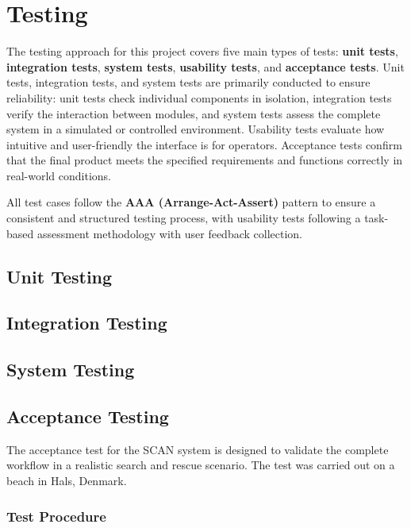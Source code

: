 \chapter{Testing}

The testing approach for this project covers five main types of tests: \textbf{unit tests}, \textbf{integration tests}, \textbf{system tests}, \textbf{usability tests}, and \textbf{acceptance tests}. Unit tests, integration tests, and system tests are primarily conducted to ensure reliability: unit tests check individual components in isolation, integration tests verify the interaction between modules, and system tests assess the complete system in a simulated or controlled environment. Usability tests evaluate how intuitive and user-friendly the interface is for operators. Acceptance tests confirm that the final product meets the specified requirements and functions correctly in real-world conditions.

All test cases follow the \textbf{AAA (Arrange-Act-Assert)} pattern to ensure a consistent and structured testing process, with usability tests following a task-based assessment methodology with user feedback collection.

\section{Unit Testing}
\section{Integration Testing}
\section{System Testing}
\section{Acceptance Testing}

The acceptance test for the SCAN system is designed to validate the complete workflow in a realistic search and rescue scenario. The test was carried out on a beach in Hals, Denmark.

\subsection{Test Procedure}

